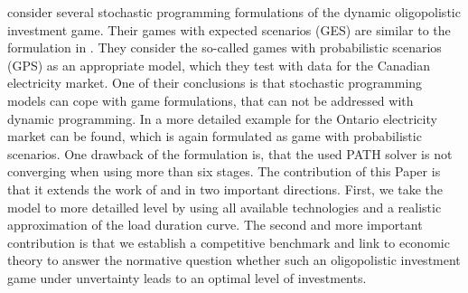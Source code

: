 \cite{Genc2007} consider several stochastic programming formulations of the dynamic oligopolistic investment game. Their games with expected scenarios (GES) are similar to the formulation in \cite{Pineau2003}. They consider the so-called games with probabilistic scenarios (GPS) as an appropriate model, which they test with data for the Canadian electricity market. One of their conclusions is that stochastic programming models can cope with game formulations, that can not be addressed with dynamic programming. In \cite{Genc2008} a more detailed example for the Ontario electricity market can be found, which is again formulated as game with probabilistic scenarios. One drawback of the formulation is, that the used PATH solver is not converging when using more than six stages.
The contribution of this Paper is that it extends the work of \cite{Genc2007} and  \cite{Genc2008} in two important directions. First, we take the model to more detailled level by using all available technologies and a realistic approximation of the load duration curve. The second and more important contribution is that we establish a competitive benchmark and link to economic theory to answer the normative question whether such an oligopolistic investment game under unvertainty leads to an optimal level of investments.






